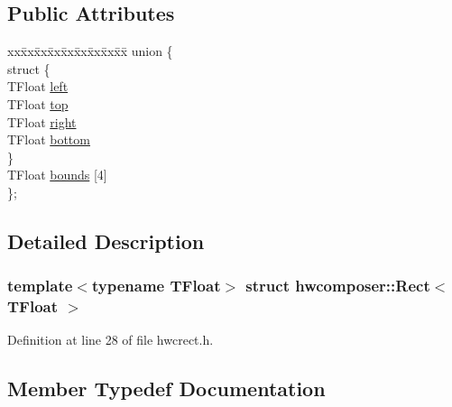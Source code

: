 \subsection*{Public Attributes}
\begin{DoxyCompactItemize}
\item 
\begin{tabbing}
xx\=xx\=xx\=xx\=xx\=xx\=xx\=xx\=xx\=\kill
union \{\\
\>struct \{\\
\>\>TFloat \mbox{\hyperlink{structhwcomposer_1_1Rect_a75263dbad1a165fae707a0b208358740}{left}}\\
\>\>TFloat \mbox{\hyperlink{structhwcomposer_1_1Rect_af8fc690f7c7980ff2b763c3cf047e401}{top}}\\
\>\>TFloat \mbox{\hyperlink{structhwcomposer_1_1Rect_ab93cc23bb659c53ef273acd7ab27ef9a}{right}}\\
\>\>TFloat \mbox{\hyperlink{structhwcomposer_1_1Rect_ac93168730cfe6d9831ac79cc5bc1a222}{bottom}}\\
\>\} \\
\>TFloat \mbox{\hyperlink{structhwcomposer_1_1Rect_abb44f7a323bfd859d5df4206ed2ed522}{bounds}} \mbox{[}4\mbox{]}\\
\}; \\

\end{tabbing}\end{DoxyCompactItemize}


\subsection{Detailed Description}
\subsubsection*{template$<$typename T\+Float$>$\newline
struct hwcomposer\+::\+Rect$<$ T\+Float $>$}



Definition at line 28 of file hwcrect.\+h.



\subsection{Member Typedef Documentation}
\mbox{\label{structhwcomposer_1_1Rect_a2213394736c5d22a67a543d8aba355e6}} 
